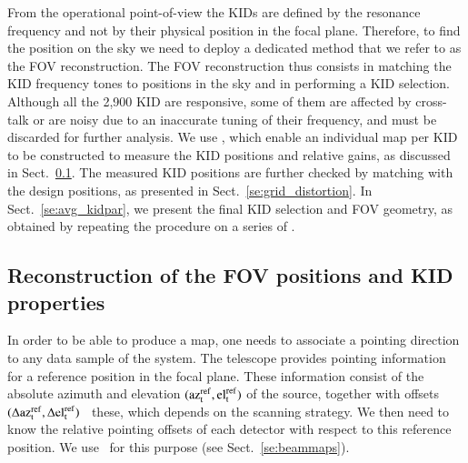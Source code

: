 
{\lp From the operational point-of-view the KIDs are defined by the
resonance frequency and not by their physical position in the focal
plane. Therefore, to find the position on the sky we need to deploy
a dedicated method that we refer to as the FOV reconstruction.}
The FOV reconstruction thus consists in matching the KID frequency tones
to positions in the sky and in performing a KID selection.
Although all the 2,900 KID are responsive, some of them are affected by
cross-talk or are noisy due to an inaccurate tuning of their
frequency, and must be discarded for further analysis. We use \bms,
which enable an individual map per KID to be constructed %
to measure the KID positions and relative gains, as
discussed in Sect.~\ref{se:fov_geometry}. The measured KID positions
are further
checked by matching with the design positions, as presented in
Sect.~\ref{se:grid_distortion}. In Sect.~\ref{se:avg_kidpar}, we
present the final KID selection and FOV geometry, as obtained by
repeating the procedure on a series of \bms.  



\subsection{Reconstruction of the FOV positions and KID properties}
\label{se:fov_geometry}

In order to be able to produce a map, one needs to associate a pointing
direction to any data sample of the system. The telescope provides
pointing information for a reference position in the focal
plane. These information consist of the
absolute azimuth and elevation $(\rm{az}_t^{\rm{ref}},\rm{el}_t^{\rm{ref}})$
of the source, together with offsets
$(\Delta\rm{az}_t^{\rm{ref}}, \Delta\rm{el}_t^{\rm{ref}})$ \wrt~these{\lp, which 
depends on the scanning strategy.}
We then need to know the relative pointing offsets of each detector
with respect to this reference position. We use
\bms\ for this purpose (see Sect.~\ref{se:beammaps}).

